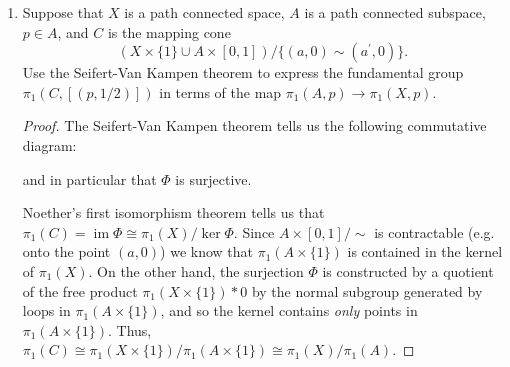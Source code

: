 \documentclass{article}
\DeclareMathOperator{\im}{im}
\begin{document}
\begin{enumerate}
\begin{proof}

Since $U,V$ are contractable, $\tilde{H}_n(U) = \tilde{H}_n(V) = 0$ for all $n$. Thus, we have the exactness of the sequence

\begin{center}
 \end{center}

and so we have that $\tilde{H}_n (X) \cong \tilde{H}_{n-1}(U \cap V)$ for all $n$. 

\end{proof}

\item Suppose that $X$ is a path connected space, $A$ is a path connected subspace, $p \in A$, and $C$ is the mapping cone
\[ \left ( X \times \{1\} \cup A \times [0 ,1 ] \right ) / \{ (a,0) \sim (a^\prime,0) \}. \]
Use the Seifert-Van Kampen theorem to express the fundamental group $\pi_1 (C, [(p, 1/2)])$ in terms of the map $\pi_1 (A,p) \rightarrow \pi_1(X,p)$.

\begin{proof}
The Seifert-Van Kampen theorem tells us the following commutative diagram:
\begin{center}
\end{center}
and in particular that $\Phi$ is surjective.

Noether's first isomorphism theorem tells us that $ \pi_1(C) = \im \Phi \cong \pi_1(X)/\ker \Phi.$
Since $A \times [0,1] / \sim$ is contractable (e.g. onto the point $(a,0)$) we know that $\pi_1(A\times \{1\})$ 
is contained in the kernel of $\pi_1(X)$.
On the other hand, the surjection $\Phi$ is constructed by a quotient of the free product $\pi_1(X\times \{1\}) * 0$
by the normal subgroup generated by loops in $\pi_1(A\times\{1\})$, and so the kernel contains \emph{only} 
points in $\pi_1(A \times \{1\})$. Thus, $\pi_1(C) \cong \pi_1(X \times \{1\})/\pi_1(A \times \{1 \}) \cong \pi_1(X)/\pi_1(A)$.


\end{proof}
\end{enumerate}
\end{document}
